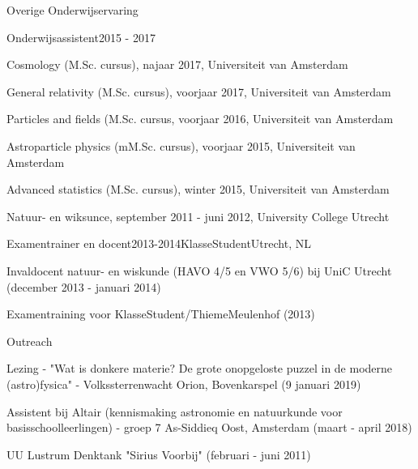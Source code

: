 \begin{rSection}{Overige Onderwijservaring}

\begin{rSubsection}{Onderwijsassistent}{2015 - 2017}{}{}
 \vspace{-1.5em}
	\item Cosmology (M.Sc. cursus), najaar 2017, Universiteit van Amsterdam
	\item General relativity (M.Sc. cursus), voorjaar 2017, Universiteit van Amsterdam
	\item Particles and fields (M.Sc. cursus, voorjaar 2016, Universiteit van Amsterdam
	\item Astroparticle physics (mM.Sc. cursus), voorjaar 2015, Universiteit van Amsterdam
	\item Advanced statistics (M.Sc. cursus), winter 2015, Universiteit van Amsterdam
  \item Natuur- en wiksunce, september 2011 - juni 2012, University College Utrecht 
\end{rSubsection}

\begin{rSubsection}{Examentrainer en docent}{2013-2014}{KlasseStudent}{Utrecht, NL}
  \vspace{-1.5em}
  \item Invaldocent natuur- en wiskunde (HAVO 4/5 en VWO 5/6) bij UniC Utrecht (december 2013 - januari 2014)
  \item Examentraining voor KlasseStudent/ThiemeMeulenhof (2013)
\end{rSubsection}

\begin{rSubsection}{Outreach}{}{}{}
  \vspace{-1.5em}
      \item Lezing - "Wat is donkere materie? De grote onopgeloste puzzel in de moderne (astro)fysica" - Volkssterrenwacht Orion,  Bovenkarspel (9 januari 2019)
      \item Assistent bij Altair (kennismaking astronomie en natuurkunde voor basisschoolleerlingen) - groep 7 As-Siddieq Oost, Amsterdam (maart - april 2018)
      \item UU Lustrum Denktank "Sirius Voorbij" (februari - juni 2011)
\end{rSubsection}
\end{rSection}


